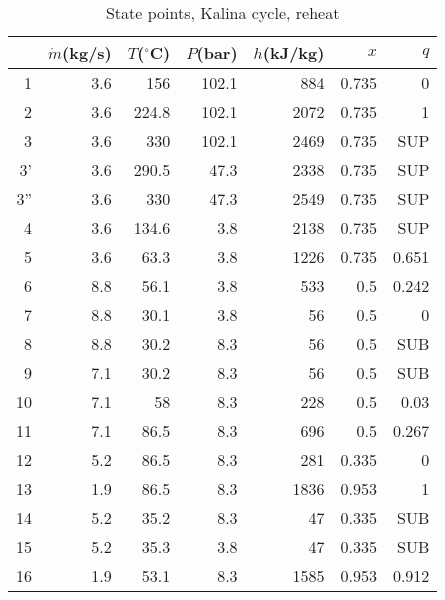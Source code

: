 \documentclass[review,3p]{elsarticle}
\begin{document}
\begin{table}[H]
\centering
\caption{State points, Kalina cycle, reheat}
%
\scriptsize

\begin{tabular}{rrrrrrr}
\toprule
 & $\dot{m}$(kg/s)&  $T$($^{\circ}$C) &  $P$(bar) &  $h$(kJ/kg) & $x$ &  $q$ \\
 \midrule
 1 & 3.6 & 156 & 102.1 & 884 & 0.735 &  0 \\

 2 & 3.6 & 224.8 & 102.1 & 2072 & 0.735 &  1 \\

 3 & 3.6 & 330 & 102.1 & 2469 & 0.735 & SUP \\

3' & 3.6 & 290.5 & 47.3 & 2338 & 0.735 & SUP \\

3'' & 3.6 & 330 & 47.3 & 2549 & 0.735 & SUP \\

 4 & 3.6 & 134.6 & 3.8 & 2138 & 0.735 & SUP \\

 5 & 3.6 & 63.3 & 3.8 & 1226 & 0.735 & 0.651 \\

 6 & 8.8 & 56.1 & 3.8 & 533 & 0.5 & 0.242 \\

 7 & 8.8 & 30.1 & 3.8 & 56 & 0.5 &  0 \\

 8 & 8.8 & 30.2 & 8.3 & 56 & 0.5 & SUB \\

 9 & 7.1 & 30.2 & 8.3 & 56 & 0.5 & SUB \\

10 & 7.1 & 58 & 8.3 & 228 & 0.5 & 0.03 \\

11 & 7.1 & 86.5 & 8.3 & 696 & 0.5 & 0.267 \\

12 & 5.2 & 86.5 & 8.3 & 281 & 0.335 &  0 \\

13 & 1.9 & 86.5 & 8.3 & 1836 & 0.953 &  1 \\

14 & 5.2 & 35.2 & 8.3 & 47 & 0.335 & SUB \\

15 & 5.2 & 35.3 & 3.8 & 47 & 0.335 & SUB \\

16 & 1.9 & 53.1 & 8.3 & 1585 & 0.953 & 0.912 \\


\end{tabular}
\end{table}
\end{document}
